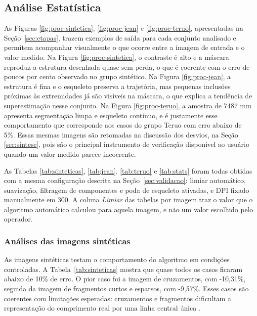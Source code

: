\documentclass[12pt]{article}
\begin{document}
\subsection{Análise Estatística}

As Figuras \ref{fig:proc-sintetica}, \ref{fig:proc-jean} e \ref{fig:proc-teruo}, apresentadas na Seção~\ref{sec:etapas}, trazem exemplos de saída para cada conjunto analisado e permitem acompanhar visualmente o que ocorre entre a imagem de entrada e o valor medido. Na Figura \ref{fig:proc-sintetica}, o contraste é alto e a máscara reproduz a estrutura desenhada quase sem perda, o que é coerente com o erro de poucos por cento observado no grupo sintético. Na Figura \ref{fig:proc-jean}, a estrutura é fina e o esqueleto preserva a trajetória, mas pequenas inclusões próximas às extremidades já são visíveis na máscara, o que explica a tendência de superestimação nesse conjunto. Na Figura \ref{fig:proc-teruo}, a amostra de 7487 mm apresenta segmentação limpa e esqueleto contínuo, e é justamente esse comportamento que corresponde aos casos do grupo Teruo com erro abaixo de 5\%. Essas mesmas imagens são retomadas na discussão dos desvios, na Seção \ref{sec:sintese}, pois são o principal instrumento de verificação disponível ao usuário quando um valor medido parece incoerente.


As Tabelas \ref{tab:sinteticas}, \ref{tab:jean}, \ref{tab:teruo} e \ref{tab:stats} foram todas obtidas com a mesma configuração descrita na Seção~\ref{sec:validacao}: limiar automático, suavização, filtragem de componentes e poda de esqueleto ativadas, e DPI fixado manualmente em 300. A coluna \emph{Limiar} das tabelas por imagem traz o valor que o algoritmo automático calculou para aquela imagem, e não um valor escolhido pelo operador.

\subsubsection{Análises das imagens sintéticas}

As imagens sintéticas testam o comportamento do algoritmo em condições controladas. A Tabela~\ref{tab:sinteticas} mostra que quase todos os casos ficaram abaixo de 10\% de erro. O pior caso foi a imagem de cruzamentos, com -10,31\%, seguida da imagem de fragmentos curtos e esparsos, com -9,57\%. Esses casos são coerentes com limitações esperadas: cruzamentos e fragmentos dificultam a representação do comprimento real por uma linha central única \cite{bucksch2014image}.
\end{document}
